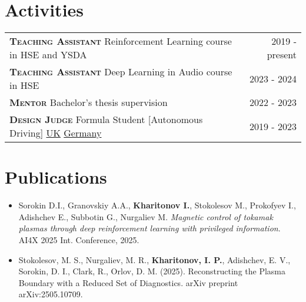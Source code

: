 \documentclass[]{resume}
\begin{document}
\section*{\sectionformat Activities}
\begin{tabular}{@{}L!{\VRule}R}
	{\textbf{\textsc{Teaching Assistant}}} Reinforcement Learning course in HSE and YSDA                                                                                                                               & 2019 - present \\
	{\textbf{\textsc{Teaching Assistant}}} Deep Learning in Audio course in HSE                                                                                                                                        & 2023 - 2024    \\
	{\textbf{\textsc{Mentor}}} Bachelor's thesis supervision                                                                                                                                                           & 2022 - 2023    \\
	{\textbf{\textsc{Design Judge}}} Formula Student [Autonomous Driving]     \href{https://www.imeche.org/events/formula-student/team-information/fs-ai}{UK}       \href{https://www.formulastudent.de/fsg/}{Germany} & 2019 - 2023    \\
\end{tabular}

\section*{\sectionformat Publications}
\begin{itemize}[leftmargin=*, itemsep=2pt, parsep=0pt, label={}]
	\item Sorokin D.I., Granovskiy A.A., \textbf{Kharitonov I.}, Stokolesov M., Prokofyev I., Adishchev E., Subbotin G., Nurgaliev M. \textit{Magnetic control of tokamak plasmas through deep reinforcement learning with privileged information}. AI4X 2025 Int. Conference, 2025.
	\item Stokolesov, M. S., Nurgaliev, M. R., \textbf{Kharitonov, I. P.}, Adishchev, E. V., Sorokin, D. I., Clark, R., Orlov, D. M. (2025). Reconstructing the Plasma Boundary with a Reduced Set of Diagnostics. arXiv preprint arXiv:2505.10709.
\end{itemize}
\end{document}
